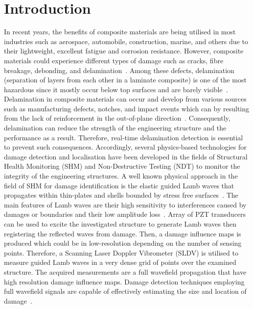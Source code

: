\section{Introduction}
In recent years, the benefits of composite materials are being utilised in most industries such as aerospace, automobile, construction, marine, and others due to their lightweight, excellent fatigue and corrosion resistance.
However, composite materials could experience different types of damage such as cracks, fibre breakage, debonding, and delamination~\cite{ip2004delamination, smith2009composite}. 
Among these defects, delamination (separation of layers from each other in a laminate composite) is one of the most hazardous since it mostly occur below top surfaces and are barely visible~\cite{Cai2012}.
Delamination in composite materials can occur and develop from various sources such as  manufacturing defects, notches, and impact events which can by resulting from the lack of reinforcement in the out-of-plane direction~\cite{Cai2012}.
Consequently, delamination can reduce the strength of the engineering structure and the performance as a result. 
Therefore, real-time delamination detection is essential to prevent such consequences.  
Accordingly, several physics-based technologies for damage detection and localisation have been developed in the fields of Structural Health Monitoring (SHM) and Non-Destructive Testing (NDT) to monitor the integrity of the engineering structures.
A well known physical approach in the field of SHM for damage identification is the elastic guided Lamb waves that propagates within thin-plates and shells bounded by stress free surfaces~\cite{mitra2016guided}.
The main features of Lamb waves are their high sensitivity to interferences caused by damages or boundaries and their low amplitude loss~\cite{Keulen2014}.
Array of PZT transducers can be used to excite the investigated structure to generate Lamb waves then registering the reflected waves from damage. 
Then, a damage influence maps is produced which could be in low-resolution depending on the number of sensing points.
Therefore, a Scanning Laser Doppler Vibrometer (SLDV) is utilised to measure guided Lamb waves in a very dense grid of points over the examined structure.
The acquired measurements are a full wavefield propagation that have high resolution damage influence maps.
Damage detection techniques employing full wavefield signals are capable of effectively estimating the size and location of damage~\cite{Girolamo2018a, kudela2018impact}. 

